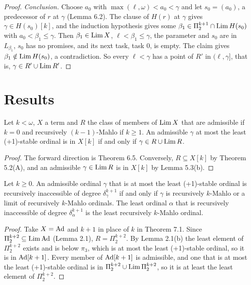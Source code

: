 \documentclass[11pt]{article}
\begin{document}
\begin{proof}
\emph{Conclusion.} Choose $a_0$ with $\max(\ell, \omega) < a_0 < \gamma$ and let $s_0 = (a_0)$, a predecessor of $r$ at
$\gamma$ (Lemma 6.2). The clause of $H(r)$ at $\gamma$ gives $\gamma \in H(s_0)[k]$, and the induction hypothesis gives
some $\beta_1 \in \Pi_2^{k+1} \cap \mathrm{Lim}\, H(s_0)$ with $a_0 < \beta_1 \le \gamma$. Then $\beta_1 \in \mathrm{Lim}\, X$, $\ell < \beta_1
\le \gamma$, the parameter and $s_0$ are in $L_{\beta_1}$, $s_0$ has no promises, and its next task, task $0$, is empty.
The claim gives $\beta_1 \notin \mathrm{Lim}\, H(s_0)$, a contradiction. So every $\ell < \gamma$ has a point of $R'$ in $(\ell,
\gamma]$, that is, $\gamma \in R' \cup \mathrm{Lim}\, R'$.
\end{proof}

\section{Results}

\begin{statement} Let $k < \omega$, $X$ a term and $R$ the class of members of $\mathrm{Lim}\, X$ that are
admissible if $k = 0$ and recursively $(k-1)$-Mahlo if $k \ge 1$. An admissible $\gamma$
at most the least (+1)-stable ordinal is in $X[k]$ if and only if $\gamma \in R \cup \mathrm{Lim}\, R$.
\end{statement}

\begin{proof}
The forward direction is Theorem 6.5. Conversely, $R \subseteq X[k]$ by Theorem 5.2(A), and an admissible $\gamma \in
\mathrm{Lim}\, R$ is in $X[k]$ by Lemma 5.3(b).
\end{proof}

\begin{statement} Let $k \ge 0$. An admissible ordinal $\gamma$ that is at most
the least (+1)-stable ordinal is recursively inaccessible of degree $\delta_\gamma^{k+1}$ if and only if $\gamma$ is
recursively $k$-Mahlo or a limit of recursively $k$-Mahlo ordinals. The least ordinal $\alpha$ that is recursively
inaccessible of degree $\delta_\alpha^{k+1}$ is the least recursively $k$-Mahlo ordinal.
\end{statement}

\begin{proof}
Take $X = \mathrm{Ad}$ and $k + 1$ in place of $k$ in Theorem 7.1. Since $\Pi_2^{k+2} \subseteq \mathrm{Lim}\, \mathrm{Ad}$ (Lemma 2.1), $R =
\Pi_2^{k+2}$. By Lemma 2.1(b) the least element of $\Pi_2^{k+2}$ exists and is below $\pi_3$, which is at most the least
(+1)-stable ordinal, so it is in $\mathrm{Ad}[k+1]$. Every member of $\mathrm{Ad}[k+1]$ is admissible, and one that is at most the
least (+1)-stable ordinal is in $\Pi_2^{k+2} \cup \mathrm{Lim}\,
\Pi_2^{k+2}$, so it is at least the least element of $\Pi_2^{k+2}$.
\end{proof}
\end{document}
